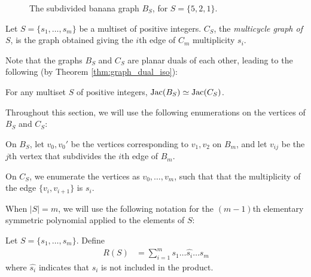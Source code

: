 \documentclass{amsart}
\begin{document}
\begin{figure}[H]
  \begin{center}
  \end{center}
  \caption{The subdivided banana graph $B_S$, for $S = \{5, 2, 1\}$.}
\end{figure}

\begin{defn}
  Let $S = \{s_1, \ldots, s_m\}$ be a multiset of positive
  integers. $C_S$, the \emph{multicycle graph of $S$}, is the graph
  obtained giving the $i$th edge of $C_m$ multiplicity $s_i$.
\end{defn}

Note that the graphs $B_S$ and $C_S$ are planar duals of each other,
leading to the following (by Theorem \ref{thm:graph_dual_iso}):

\begin{prop}
  \label{prop:banana_cycle_iso}
  For any multiset $S$ of positive integers, $\operatorname{Jac}(B_S) \simeq
  \operatorname{Jac}(C_S)$. 
\end{prop}

\begin{note}
  Throughout this section, we will use the following enumerations on
  the vertices of $B_S$ and $C_S$:

  On $B_S$, let $v_0, v_0'$ be the vertices corresponding to $v_1,
  v_2$ on $B_m$, and let $v_{ij}$ be the $j$th vertex that subdivides
  the $i$th edge of $B_m$.

  On $C_S$, we enumerate the vertices as $v_0, \ldots, v_m$, such
  that that the multiplicity of the edge $\{v_i, v_{i+1}\}$ is $s_i$.
\end{note}

When $|S| = m$, we will use the following notation for the $(m-1)$th
elementary symmetric polynomial applied to the elements of $S$:

\begin{defn}
  Let $S = \{s_1, \ldots, s_m\}$. Define
  \begin{align*}
    R(S) &= \sum_{i=1}^ms_1\ldots\hat{s_i}\ldots s_m 
  \end{align*}
  where $\hat{s_i}$ indicates that $s_i$ is not included in the
  product.
\end{defn}
\end{document}
